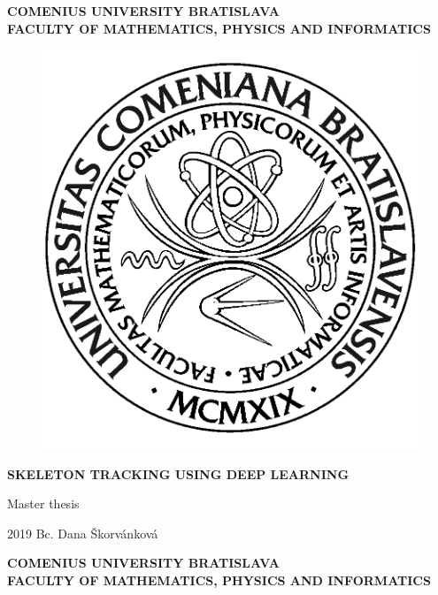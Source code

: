 \documentclass[12pt, a4paper, oneside]{book}
\newcommand\mftitle{Skeleton Tracking using Deep Learning}
\newcommand\mfthesistype{Master thesis}
\newcommand\mfauthor{Bc. Dana Škorvánková}
\newcommand\mfuniversity{COMENIUS UNIVERSITY BRATISLAVA}
\newcommand\mffaculty{FACULTY OF MATHEMATICS, PHYSICS AND INFORMATICS}
\begin{document}
\frontmatter

\thispagestyle{empty}

\noindent
\begin{minipage}{\textwidth}
\begin{center}
\textbf{\mfuniversity \\
\mffaculty}
\end{center}
\end{minipage}

\vfill
\begin{figure}[!hbt]
	\begin{center}
		\includegraphics{images/logo_fmph}
		\label{img:logo}
	\end{center}
\end{figure}
\begin{center}
	\begin{minipage}{0.8\textwidth}
		\centerline{\textbf{\Large\MakeUppercase{\mftitle}}}
		\smallskip
		\centerline{\mfthesistype}
	\end{minipage}
\end{center}
\vfill
2019 \hfill
\mfauthor
\eject 

\thispagestyle{empty}

\noindent
\begin{minipage}{\textwidth}
\begin{center}
\textbf{\mfuniversity \\
\mffaculty}
\end{center}
\end{minipage}
\end{document}
